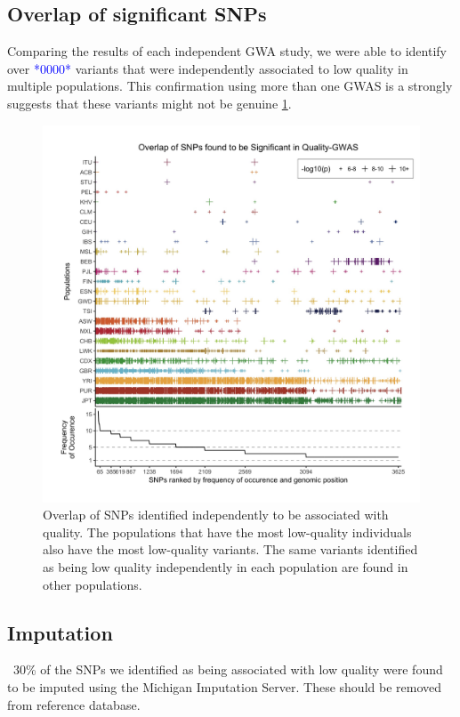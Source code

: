 \documentclass[9pt,lineno]{elife}
\newcommand{\todo}[1]{\textcolor{blue}{*#1*}}
\begin{document}
	\subsection{Overlap of significant SNPs}
Comparing the results of each independent GWA study, we were able to identify over \todo{0000} variants that were independently associated to low quality in multiple populations. This confirmation using more than one GWAS is a strongly suggests that these variants might not be genuine \ref{Figure3}. 

\begin{figure}
\includegraphics[width=\hsize,keepaspectratio]{SNPOverlap6.jpg}

\caption{Overlap of SNPs identified independently to be associated with quality. 
The populations that have the most low-quality individuals also have the most low-quality variants. 
The same variants identified as being low quality independently in each population are found in other populations. }
  \label{Figure3}
\end{figure}

	\subsection{Imputation}
~30\% of the SNPs we identified as being associated with low quality were found to be imputed using the Michigan Imputation Server. These should be removed from reference database.
\end{document}
